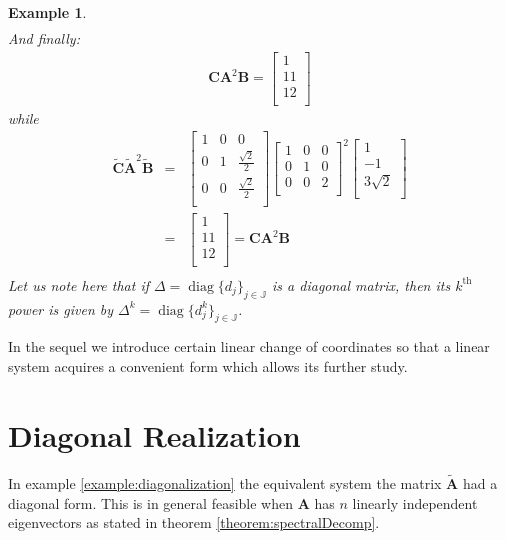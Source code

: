 \documentclass[a4paper,10pt,oneside]{book}
\newtheorem{example}{Example}
\begin{document}
\begin{example}
\begin{eqnarray}
\end{eqnarray}
And finally:
\begin{eqnarray}
 \mathbf{CA}^2\mathbf{B}=\left[ {\begin{array}{c}
 1 \\ 11 \\ 12 \\
 \end{array} } \right]
\end{eqnarray}
while
\begin{eqnarray}
 \tilde{\mathbf{C}}\tilde{\mathbf{A}}^2\tilde{\mathbf{B}}&=&\left[ {\begin{array}{ccc}
 1 & 0 & 0  \\
 0 & 1 & \frac{\sqrt{2}}{2}  \\
 0 & 0 & \frac{\sqrt{2}}{2} \\
 \end{array} } \right]\left[ {\begin{array}{ccc}
 1 & 0 & 0  \\
 0 & 1 & 0  \\
 0 & 0 & 2 \\
 \end{array} } \right]^2
\left[ {\begin{array}{c}
 1 \\ -1 \\ 3\sqrt{2} \\
 \end{array} } \right]\\
&=&\left[ {\begin{array}{c}
 1 \\ 11 \\ 12 \\
 \end{array} } \right]=\mathbf{CA}^2\mathbf{B}\\
\end{eqnarray}
Let us note here that if $\Delta=\operatorname{diag}\{d_j\}_{j\in\mathbb{J}}$ is a diagonal matrix, then its $k^{\text{th}}$ power is given by $\Delta^k=\operatorname{diag}\{d_j^k\}_{j\in \mathbb{J}}$.
\end{example}
In the sequel we introduce certain linear change of coordinates so that a linear system acquires a convenient form which allows its further study.

\section{Diagonal Realization}\label{sect:DiagonalRealization}
In example \ref{example:diagonalization} the equivalent system the matrix $\tilde{\mathbf{A}}$ had a diagonal form. This is in general feasible when $\mathbf{A}$ has $n$ linearly independent eigenvectors as stated in theorem \ref{theorem:spectralDecomp}.
\end{document}
